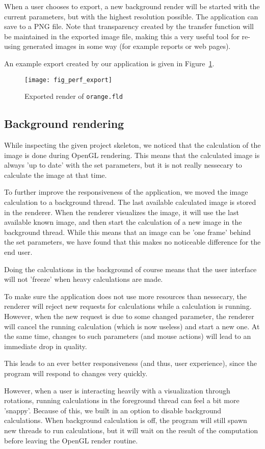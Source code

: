 When a user chooses to export, a new background render will be started with the current parameters, but with the highest resolution possible.
The application can save to a PNG file.
Note that transparency created by the transfer function will be maintained in the exported image file, making this a very useful tool for re-using generated images in some way (for example reports or web pages).

An example export created by our application is given in Figure~\ref{fig:perf:export}.

\begin{figure}[H]
	\centering
	\texttt{[image: fig\_perf\_export]}
	\caption{Exported render of \texttt{orange.fld}}
	\label{fig:perf:export}
\end{figure}

\subsection{Background rendering}
\label{Sec:Perf:Background}
While inspecting the given project skeleton, we noticed that the calculation of the image is done during OpenGL rendering.
This means that the calculated image is always 'up to date' with the set parameters, but it is not really nessecary to calculate the image at that time.

To further improve the responsiveness of the application, we moved the image calculation to a background thread.
The last available calculated image is stored in the renderer.
When the renderer visualizes the image, it will use the last available known image, and then start the calculation of a new image in the background thread.
While this means that an image can be 'one frame' behind the set parameters, we have found that this makes no noticeable difference for the end user.

Doing the calculations in the background of course means that the user interface will not 'freeze' when heavy calculations are made.

To make sure the application does not use more resources than nessecary, the renderer will reject new requests for calculations while a calculation is running.
However, when the new request is due to some changed parameter, the renderer will cancel the running calculation (which is now useless) and start a new one.
At the same time, changes to such parameters (and mouse actions) will lead to an immediate drop in quality.

This leads to an ever better responsiveness (and thus, user experience), since the program will respond to changes very quickly.

However, when a user is interacting heavily with a visualization through rotations, running calculations in the foreground thread can feel a bit more 'snappy'.
Because of this, we built in an option to disable background calculations.
When background calculation is off, the program will still spawn new threads to run calculations, but it will wait on the result of the computation before leaving the OpenGL render routine.
